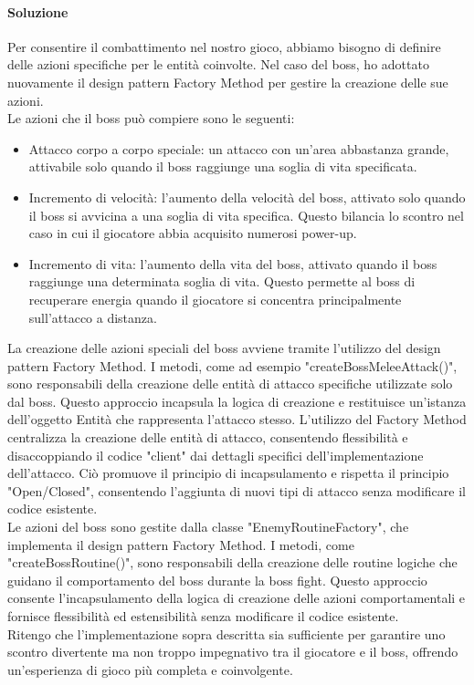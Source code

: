 \documentclass[a4paper,12pt]{report}
\begin{document}
\paragraph*{Soluzione}
Per consentire il combattimento nel nostro gioco, abbiamo bisogno di definire delle azioni specifiche per le entità coinvolte. 
Nel caso del boss, ho adottato nuovamente il design pattern Factory Method per gestire la creazione delle sue azioni.
\\
Le azioni che il boss può compiere sono le seguenti:
\begin{itemize}
	\item Attacco corpo a corpo speciale: un attacco con un'area abbastanza grande, attivabile solo quando il boss raggiunge una soglia di vita specificata.
	\item Incremento di velocità: l'aumento della velocità del boss, attivato solo quando il boss si avvicina a una soglia di vita specifica. 
	Questo bilancia lo scontro nel caso in cui il giocatore abbia acquisito numerosi power-up.
	\item Incremento di vita: l'aumento della vita del boss, attivato quando il boss raggiunge una determinata soglia di vita.
	Questo permette al boss di recuperare energia quando il giocatore si concentra principalmente sull'attacco a distanza.
\end{itemize}
La creazione delle azioni speciali del boss avviene tramite l'utilizzo del design pattern Factory Method. I metodi, come ad esempio "createBossMeleeAttack()", sono responsabili della creazione delle entità di attacco specifiche utilizzate solo dal boss.
Questo approccio incapsula la logica di creazione e restituisce un'istanza dell'oggetto Entità che rappresenta l'attacco stesso.
L'utilizzo del Factory Method centralizza la creazione delle entità di attacco, consentendo flessibilità e disaccoppiando il codice "client" dai dettagli specifici dell'implementazione dell'attacco.
Ciò promuove il principio di incapsulamento e rispetta il principio "Open/Closed", consentendo l'aggiunta di nuovi tipi di attacco senza modificare il codice esistente.
\\
Le azioni del boss sono gestite dalla classe "EnemyRoutineFactory", che implementa il design pattern Factory Method. I metodi, come "createBossRoutine()", sono responsabili della creazione delle routine logiche che guidano il comportamento del boss durante la boss fight.
Questo approccio consente l'incapsulamento della logica di creazione delle azioni comportamentali e fornisce flessibilità ed estensibilità senza modificare il codice esistente.
\\
Ritengo che l'implementazione sopra descritta sia sufficiente per garantire uno scontro divertente ma non troppo impegnativo tra il giocatore e il boss, offrendo un'esperienza di gioco più completa e coinvolgente.
\end{document}
